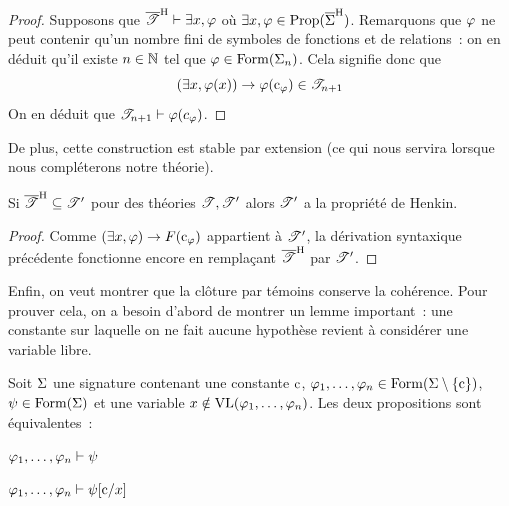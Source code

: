 \begin{proof}
  Supposons que $\overline{\mathscr T}^{\mathrm H}\vdash\exists x,\varphi$ où
  $\exists x, \varphi\in\operatorname{Prop}(\overline{\Sigma}^{\mathrm H})$.
  Remarquons que $\varphi$ ne peut contenir
  qu'un nombre fini de symboles de fonctions et de relations~: on en déduit
  qu'il existe $n\in \mathbb N$ tel que $\varphi\in\operatorname{Form}(\Sigma_n)$. Cela signifie
  donc que
  \[(\exists x,\varphi(x))\to \varphi(\mathrm{c}_{\varphi}) \in \mathscr T_{n+1}\]
  On en déduit que $\mathscr T_{n+1}\vdash \varphi(c_{\varphi})$.
\end{proof}

\noindent
De plus, cette construction est stable par extension (ce qui nous servira
lorsque nous compléterons notre théorie).

\begin{property}\label{prop.henkin.ext}
  Si $\overline{\mathscr T}^{\mathrm H}\subseteq \mathscr T'$ pour des théories $\mathscr T,\mathscr T'$
  alors $\mathscr T'$ a la propriété de Henkin.
\end{property}

\begin{proof}
  Comme $(\exists x,\varphi)\to F(\mathrm{c}_\varphi)$ appartient à $\mathscr T'$,
  la dérivation syntaxique précédente fonctionne encore en remplaçant
  $\overline{\mathscr T}^{\mathrm H}$ par $\mathscr T'$.
\end{proof}

Enfin, on veut montrer que la clôture par témoins conserve la cohérence. Pour
prouver cela, on a besoin d'abord de montrer un lemme important~: une constante
sur laquelle on ne fait aucune hypothèse revient à considérer une variable
libre.

\begin{lemma}\label{lem.var.const}
  Soit $\Sigma$ une signature contenant une constante $\mathrm{c}$,
  $\varphi_1,\ldots,\varphi_n\in\operatorname{Form}(\Sigma\setminus\{\mathrm{c}\})$,
  $\psi\in\operatorname{Form}(\Sigma)$ et
  une variable $x\notin \operatorname{VL}(\varphi_1,\ldots,\varphi_n)$.
  Les deux propositions sont équivalentes~:
  \begin{itemize}
    \begin{minipage}{0.5\textwidth}
    \item $\varphi_1,\ldots,\varphi_n\vdash \psi$
    \end{minipage}
    \begin{minipage}{0.4\textwidth}
    \item $\varphi_1,\ldots,\varphi_n\vdash \psi[\mathrm{c}/x]$
    \end{minipage}
  \end{itemize}
\end{lemma}

